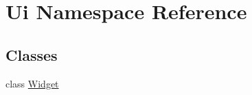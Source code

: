 \hypertarget{namespaceUi}{}\section{Ui Namespace Reference}
\label{namespaceUi}
\subsection*{Classes}
\begin{DoxyCompactItemize}
\item 
class \hyperlink{classUi_1_1Widget}{Widget}
\end{DoxyCompactItemize}
